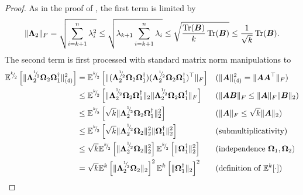 \documentclass[12pt]{article}
\begin{document}
\begin{proof}
    As in the proof of \cite[lemma 3]{meyer-2021-hutch-optimal}, the first term is limited by
    \begin{equation}
        \lVert \boldsymbol{\Lambda}_2 \rVert _F
        = \sqrt{\sum_{i=k+1}^{n} \lambda_i^2}
        \leq \sqrt{ \lambda_{k+1} \sum_{i=k+1}^{n} \lambda_i}
        \leq \sqrt{ \frac{\operatorname{Tr}(\boldsymbol{B})}{k} \operatorname{Tr}(\boldsymbol{B})}
        \leq \frac{1}{\sqrt{k}} \operatorname{Tr}(\boldsymbol{B}).
        \label{equ:nystrom-proof-frobenius-trace}
    \end{equation}
    The second term is first processed with standard matrix norm manipulations to
    \begin{align}
        \mathbb{E}^{\sfrac{k}{2}}\left[ \lVert \mtx{\Lambda}_2^{\sfrac{1}{2}} \mtx{\Omega}_2 \mtx{\Omega}_1^{\dagger} \rVert _{(4)}^2 \right]
        &= \mathbb{E}^{\sfrac{k}{2}}\left[ \lVert (\mtx{\Lambda}_2^{\sfrac{1}{2}} \mtx{\Omega}_2 \mtx{\Omega}_1^{\dagger} )( \mtx{\Lambda}_2^{\sfrac{1}{2}} \mtx{\Omega}_2 \mtx{\Omega}_1^{\dagger})^{\top} \rVert _F \right] && \text{($\lVert \mtx{A} \rVert _{(4)}^2 = \lVert \mtx{A} \mtx{A}^{\top} \rVert _{F}$)} \notag \\
        &\leq \mathbb{E}^{\sfrac{k}{2}}\left[ \lVert \mtx{\Lambda}_2^{\sfrac{1}{2}} \mtx{\Omega}_2 \mtx{\Omega}_1^{\dagger} \rVert _2 \lVert \mtx{\Lambda}_2^{\sfrac{1}{2}} \mtx{\Omega}_2 \mtx{\Omega}_1^{\dagger} \rVert _F \right] && \text{($\lVert \mtx{A} \mtx{B} \rVert _F \leq \lVert \mtx{A} \rVert _F \lVert \mtx{B} \rVert _2$)} \notag \\
        &\leq \mathbb{E}^{\sfrac{k}{2}}\left[ \sqrt{k} \lVert \mtx{\Lambda}_2^{\sfrac{1}{2}} \mtx{\Omega}_2 \mtx{\Omega}_1^{\dagger} \rVert _2^2 \right]  && \text{($\lVert \mtx{A} \rVert _F \leq \sqrt{k} \lVert \mtx{A} \rVert _2$)} \notag \\
        &\leq \mathbb{E}^{\sfrac{k}{2}}\left[ \sqrt{k} \lVert \mtx{\Lambda}_2^{\sfrac{1}{2}} \mtx{\Omega}_2 \rVert _2^2 \lVert \mtx{\Omega}_1^{\dagger} \rVert _2^2 \right]  && \text{(submultiplicativity)} \notag \\
        &\leq \sqrt{k} \mathbb{E}^{\sfrac{k}{2}}\left[ \lVert \mtx{\Lambda}_2^{\sfrac{1}{2}} \mtx{\Omega}_2 \rVert _2^2\right] \mathbb{E}^{\sfrac{k}{2}}\left[ \lVert \mtx{\Omega}_1^{\dagger} \rVert _2^2  \right]  && \text{(independence $\mtx{\Omega}_1, \mtx{\Omega}_2$)} \notag \\
        &= \sqrt{k} \mathbb{E}^{k}\left[ \lVert \mtx{\Lambda}_2^{\sfrac{1}{2}} \mtx{\Omega}_2 \rVert _2 \right]^2 \mathbb{E}^{k}\left[  \lVert \mtx{\Omega}_1^{\dagger} \rVert _2 \right]^2 && \text{(definition of $\mathbb{E}^{k}[\cdot]$)}

\end{align}
\end{proof}
\end{document}
